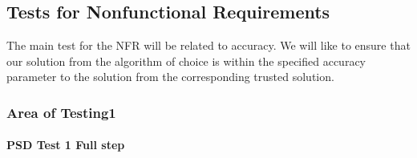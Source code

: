 \documentclass[12pt, titlepage]{article}
\begin{document}
\subsection{Tests for Nonfunctional Requirements}
The main test for the NFR will be related to accuracy. We will like to ensure that 
our solution from the algorithm of choice is within the specified accuracy parameter 
to the solution from the corresponding trusted solution.

\subsubsection{Area of Testing1}
		
\paragraph{PSD Test 1 Full step }
\end{document}
